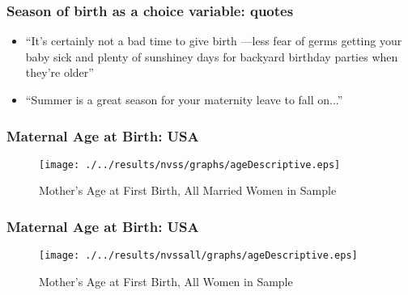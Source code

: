 \documentclass[10pt,letterpaper,subeqn]{beamer}
\begin{document}
\begin{frame}[label=anecdotes]
\frametitle{Season of birth as a choice variable: quotes}
\begin{itemize}
\item ``It's certainly not a bad time to give birth ---less fear of germs getting your baby sick and plenty of sunshiney days for backyard birthday parties when they're older''
\item ``Summer is a great season for your maternity leave to fall on...''
\end{itemize}
\hyperlink{thispaper}{}
\end{frame}


\begin{frame}[label=ageHist]
\frametitle{Maternal Age at Birth: USA}
\begin{figure}[htpb!]
\begin{center}
  \centering
  \caption{Mother's Age at First Birth, All Married Women in Sample}
  \texttt{[image: ./../results/nvss/graphs/ageDescriptive.eps]}
  \label{fig:NVSSbirths}
\end{center}
\end{figure}
\vspace{-5mm}
\end{frame}

\begin{frame}[label=ageHist2]
\frametitle{Maternal Age at Birth: USA}
\begin{figure}[htpb!]
\begin{center}
  \centering
  \caption{Mother's Age at First Birth, All Women in Sample}
  \texttt{[image: ./../results/nvssall/graphs/ageDescriptive.eps]}
  \label{fig:NVSSbirthsAll}
\end{center}
\end{figure}
\vspace{-5mm}
\hyperlink{Data}{}
\end{frame}
\end{document}
